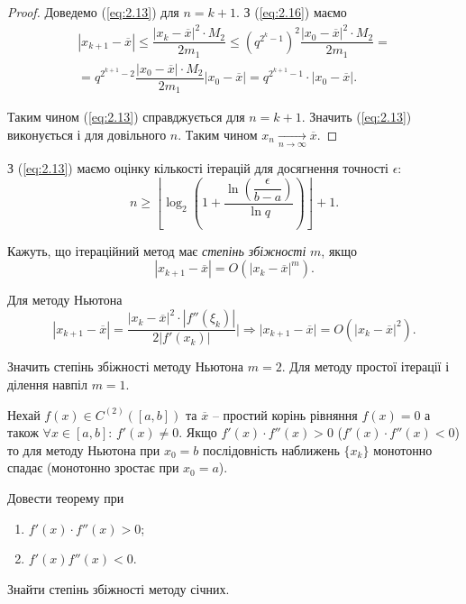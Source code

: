 \begin{proof}
	Доведемо (\ref{eq:2.13}) для $n = k +1$. З (\ref{eq:2.16}) маємо 
	\begin{multline*}
		|x_{k+1}-\overline{x}| \le \dfrac{|x_k - \overline{x}|^2\cdot M_2}{2m_1} \le \left(q^{2^k-1}\right)^2 \dfrac{|x_0-\overline{x}|^2\cdot M_2}{2m_1} = \\
		= q^{2^{k+1}-2} \dfrac{|x_0-\overline{x}|\cdot M_2}{2m_1}|x_0-\overline{x}| = q^{2^{k+1}-1} \cdot |x_0-\overline{x}|.
	\end{multline*}

	Таким чином (\ref{eq:2.13}) справджується для $n = k +1$. Значить (\ref{eq:2.13}) виконується і для довільного $n$. Таким чином $x_n \xrightarrow[n\to\infty]{} \overline{x}$.
\end{proof}

З (\ref{eq:2.13}) маємо оцінку кількості ітерацій для досягнення точності $\epsilon$:
\[ n \ge \left\lfloor\log_2\left(1+\dfrac{\ln \left(\dfrac{\epsilon}{b-a}\right)}{\ln q}\right) \right\rfloor + 1 .\]

Кажуть, що ітераційний метод має \textit{степінь збіжності} $m$, якщо \[ |x_{k+1}-\overline{x}|=O(|x_k-\overline{x}|^m).\]

Для методу Ньютона 
\[|x_{k+1}-\overline{x}| = \dfrac{|x_k-\overline{x}|^2\cdot|f''(\xi_k)|}{2|f'(x_k)|}| \Rightarrow |x_{k+1}-\overline{x}|=O(|x_k-\overline{x}|^2).\]

Значить степінь збіжності методу Ньютона $m=2$. Для методу простої ітерації і ділення навпіл $m=1$.

\begin{theorem}
	Нехай $f(x)\in C^{(2)}([a,b])$ та $\overline{x}$ -- простий корінь рівняння $f (x) = 0$ а також $\forall x\in[a,b]$: $f'(x) \ne 0$. Якщо $f'(x) \cdot f''(x) > 0$ ($f'(x) \cdot f''(x) < 0$) то для методу Ньютона при $x_0 = b$ послідовність наближень $\{x_k \}$ монотонно спадає (монотонно зростає при $x_0 = a$).
\end{theorem}

\begin{problem}
	Довести теорему при 
	\begin{enumerate}
		\item $f'(x) \cdot f''(x) > 0$;
		\item $f'(x) f''(x) < 0$.
	\end{enumerate}
\end{problem}

\begin{problem}
	Знайти степінь збіжності методу січних.
\end{problem}


